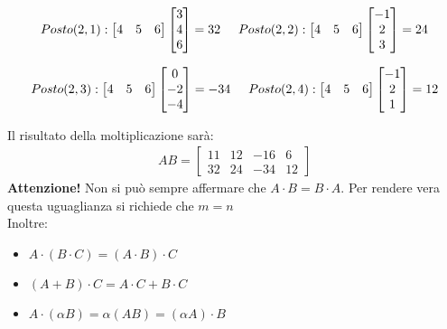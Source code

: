 \documentclass[a4paper, 10pt]{article}
\begin{document}
	\begin{align*} 
		Posto (2,1): \begin{bmatrix} 4 & 5 & 6 \end{bmatrix} \begin{bmatrix} 3 \\ 4 \\ 6 \end{bmatrix} = 32 		
		\hspace{0.5cm}			
		Posto (2,2): \begin{bmatrix} 4 & 5 & 6 \end{bmatrix} \begin{bmatrix} -1 \\ 2 \\ 3 	\end{bmatrix} = 24 
	\end{align*}
	
	\begin{align*}	
		Posto (2,3): \begin{bmatrix} 4 & 5 & 6 \end{bmatrix} \begin{bmatrix} 0 \\ -2 \\ -4 \end{bmatrix} = -34 
		\hspace{0.5cm}
		Posto (2,4): \begin{bmatrix} 4 & 5 & 6 \end{bmatrix} \begin{bmatrix} -1 \\ 2 \\ 1 	\end{bmatrix}= 12 
	\end{align*}
	
	Il risultato della moltiplicazione sarà:
	\begin{align*}
		AB = \begin{bmatrix}
			11 & 12 & -16 & 6 \\
			32 & 24 & -34 & 12
		\end{bmatrix}
	\end{align*}
	\textbf{Attenzione!} Non si può sempre affermare che $A \cdot B = B \cdot A$. Per rendere vera questa 
	uguaglianza si richiede che $m = n$ \\
	Inoltre:
	\begin{itemize}
		\item $A \cdot (B \cdot C) = (A \cdot B) \cdot C$
		\item $(A + B) \cdot C = A \cdot C + B \cdot C$
		\item $A \cdot (\alpha B) = \alpha (AB) = (\alpha A) \cdot B$
	\end{itemize}
	
\end{document}
